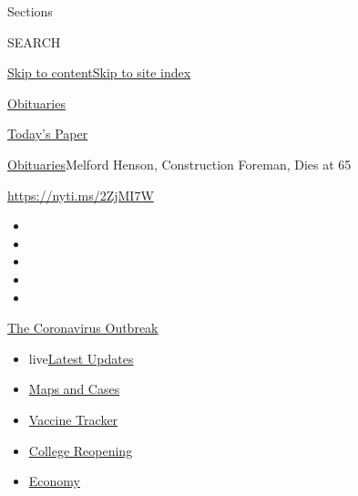 Sections

SEARCH

\protect\hyperlink{site-content}{Skip to
content}\protect\hyperlink{site-index}{Skip to site index}

\href{https://www.nytimes3xbfgragh.onion/section/obituaries}{Obituaries}

\href{https://myaccount.nytimes3xbfgragh.onion/auth/login?response_type=cookie\&client_id=vi}{}

\href{https://www.nytimes3xbfgragh.onion/section/todayspaper}{Today's
Paper}

\href{/section/obituaries}{Obituaries}\textbar{}Melford Henson,
Construction Foreman, Dies at 65

\url{https://nyti.ms/2ZjMI7W}

\begin{itemize}
\item
\item
\item
\item
\item
\end{itemize}

\href{https://www.nytimes3xbfgragh.onion/news-event/coronavirus?action=click\&pgtype=Article\&state=default\&region=TOP_BANNER\&context=storylines_menu}{The
Coronavirus Outbreak}

\begin{itemize}
\tightlist
\item
  live\href{https://www.nytimes3xbfgragh.onion/2020/08/04/world/coronavirus-covid-19.html?action=click\&pgtype=Article\&state=default\&region=TOP_BANNER\&context=storylines_menu}{Latest
  Updates}
\item
  \href{https://www.nytimes3xbfgragh.onion/interactive/2020/us/coronavirus-us-cases.html?action=click\&pgtype=Article\&state=default\&region=TOP_BANNER\&context=storylines_menu}{Maps
  and Cases}
\item
  \href{https://www.nytimes3xbfgragh.onion/interactive/2020/science/coronavirus-vaccine-tracker.html?action=click\&pgtype=Article\&state=default\&region=TOP_BANNER\&context=storylines_menu}{Vaccine
  Tracker}
\item
  \href{https://www.nytimes3xbfgragh.onion/2020/08/02/us/covid-college-reopening.html?action=click\&pgtype=Article\&state=default\&region=TOP_BANNER\&context=storylines_menu}{College
  Reopening}
\item
  \href{https://www.nytimes3xbfgragh.onion/live/2020/08/03/business/stock-market-today-coronavirus?action=click\&pgtype=Article\&state=default\&region=TOP_BANNER\&context=storylines_menu}{Economy}
\end{itemize}

